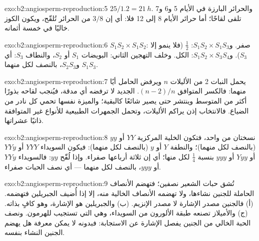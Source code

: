 \begin{solution}{exo:b2:angiosperm-reproduction:5}
$25/1.2 = \qty{21}{h}$. والحرائر البارزة في الأيام 5 و6 و7 تلقى لقاحًا؛
أما حرائر الأيام 8 إلى 12 فلا: أي إن $3/8$ من الحرائر تُلقّح، ويكون
الكوز خاليًا في خمسة أثمانه.
\end{solution}

\begin{solution}{exo:b2:angiosperm-reproduction:6}
$S_1S_2\times S_1S_2$: صفر. و$S_1S_2\times S_1S_3$: $\tfrac12$ (فلا ينمو إلا 
$S_3$). و$S_1S_2\times S_3S_4$: الكل. وخلف التهجين
الثاني: البويضات $S_1$ أو $S_2$، والنطاف $S_3$: أي $S_1S_3$ و$S_2S_3$،
بالنصف لكل منهما.
\end{solution}

\begin{solution}{exo:b2:angiosperm-reproduction:7}
يحمل النبات 2 من الأليلات $n$ ويرفض  الحامل أيًا منهما:
فالكسر المتوافق $(n - 2)/n$.  الجديد لا ترفضه أي مدقة،
فيُنجب لقاحه بذورًا أكثر من المتوسط وينتشر حتى يصير شائعًا كالبقية؛
والميزة نفسها تحمي كل  نادر من الضياع. فالانتخاب إذن يراكم
الأليلات، وتحمل الجمهرات الطبيعية للأنواع غير المتوافقة ذاتيًا عشراتها.
\end{solution}

\begin{solution}{exo:b2:angiosperm-reproduction:8}
 نسختان من  واحد، فتكون الخلية المركزية
$YY$ أو $yy$ (بالنصف لكل منهما)؛ والنطفة $Y$ أو $y$ (بالنصف لكل
منهما): فيكون السويداء $YYY$ أو $YYy$ أو $Yyy$ أو $yyy$ بنسبة $\tfrac14$ لكل منها؛ أي إن ثلاثة
أرباعها صفراء. وإذا لُقّح  $yy$: فالسويداء $YYy$ أو $yyy$، بالنصف لكل منهما ---
أي نصف الحبات صفراء.
\end{solution}

\begin{solution}{exo:b2:angiosperm-reproduction:9}
تُشق حبات الشعير نصفين؛ فتهضم الأنصاف الحاملة للجنين نشاءها، ولا
تهضمه الأنصاف الخالية منه، إلا إذا أُضيف الجبريلين فتهضمه. (أ)
فالجنين مصدر الإشارة لا مصدر الإنزيم. (ب) والجبريلين هو الإشارة،
وهو كافٍ بذاته. (ج) والأميلاز تصنعه طبقة الألورون من السويداء،
وهي التي تستجيب للهرمون. ونصف الحبة الخالي من الجنين يفصل الإشارة
عن الاستجابة: فبدونه لا يمكن معرفة هل يهضم الجنين النشاء بنفسه.
\end{solution}

